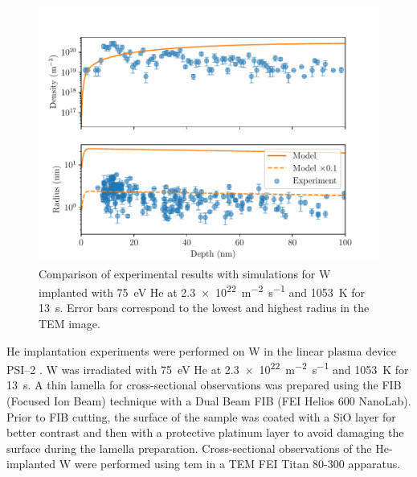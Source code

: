 \begin{figure} [h!]
    \centering
    \includegraphics[width=\linewidth]{Figures/Chapter4/comparison_model_exp.pdf}
    \caption{Comparison of experimental results with simulations for W implanted with \SI{75}{eV} He at \SI{2.3e22}{m^{-2}.s^{-1}} and \SI{1053}{K} for \SI{13}{s}. Error bars correspond to the lowest and highest radius in the TEM image.}
\end{figure}


He implantation experiments were performed on W in the linear plasma device PSI--2 .
W was irradiated with \SI{75}{eV} He at \SI{2.3e22}{m^{-2}.s^{-1}} and \SI{1053}{K} for \SI{13}{s}.
A thin lamella for cross-sectional observations was prepared using the FIB (Focused Ion Beam) technique with a Dual Beam FIB (FEI Helios 600 NanoLab).
Prior to FIB cutting, the surface of the sample was coated with a SiO layer for better contrast and then with a protective platinum layer to avoid damaging the surface during the lamella preparation.
Cross-sectional observations of the He-implanted W were performed using \gls{tem} in a TEM FEI Titan 80-300 apparatus.

